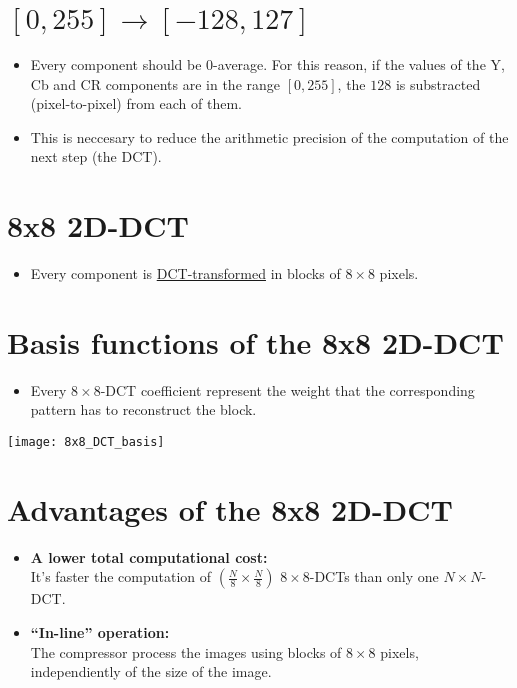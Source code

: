 \section{$[0,255]\rightarrow [-128,127]$}
\begin{itemize}
\item Every component should be 0-average. For this reason, if the
  values of the Y, Cb and CR components are in the range $[0,255]$,
  the $128$ is substracted (pixel-to-pixel) from each of them.
\item This is neccesary to reduce the arithmetic precision of the
  computation of the next step (the DCT).
\end{itemize}

\section{8x8 2D-DCT}
\begin{itemize}
\item Every component is
  \href{http://www.ual.es/~vruiz/docencia/JPEG/index.html#x1-160008}{DCT-transformed}
  in blocks of $8\times 8$ pixels.
\end{itemize}

\section{Basis functions of the 8x8 2D-DCT}
\begin{itemize}
\item Every $8\times 8$-DCT coefficient represent the weight that the
  corresponding pattern has to reconstruct the block.
\end{itemize}
\vspace{-3ex}
\begin{center}
  \texttt{[image: 8x8\_DCT\_basis]}
\end{center}

\section{Advantages of the 8x8 2D-DCT}
\begin{itemize}
\item \textbf{A lower total computational cost:}\\ It's faster the
  computation of $(\frac{N}{8}\times \frac{N}{8})$ $8\times 8$-DCTs
  than only one $N\times N$-DCT.
\item \textbf{``In-line'' operation:}\\
  The compressor process the images using blocks of $8\times 8$
  pixels, independiently of the size of the image.
\end{itemize}

